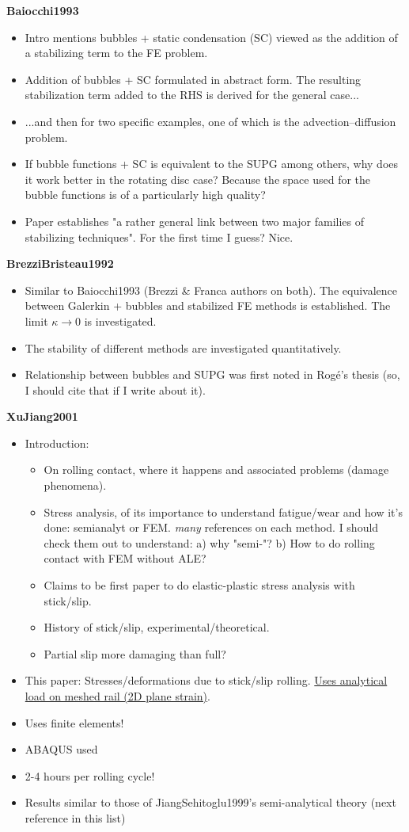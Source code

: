 \documentclass{article}
\begin{document}
\textbf{Baiocchi1993}
\begin{itemize}
\item Intro mentions bubbles + static condensation (SC) viewed as the addition of a stabilizing term to the FE problem.
\item Addition of bubbles + SC formulated in abstract form. The resulting stabilization term added to the RHS is derived for the general case...
\item ...and then for two specific examples, one of which is the advection--diffusion problem.
\item If bubble functions + SC is equivalent to the SUPG among others, why does it work better in the rotating disc case? Because the space used for the bubble functions is of a particularly high quality?
\item Paper establishes "a rather general link between two major families of stabilizing techniques". For the first time I guess? Nice.
\end{itemize}

\textbf{BrezziBristeau1992}
\begin{itemize}
\item Similar to Baiocchi1993 (Brezzi \& Franca authors on both). The equivalence between Galerkin + bubbles and stabilized FE methods is established. The limit $\kappa \rightarrow 0$ is investigated.
\item The stability of different methods are investigated quantitatively.
\item Relationship between bubbles and SUPG was first noted in Rogé's thesis (so, I should cite that if I write about it).
\end{itemize}

\textbf{XuJiang2001}
\begin{itemize}
\item Introduction:
\begin{itemize}
\item On rolling contact, where it happens and associated problems (damage phenomena).
\item Stress analysis, of its importance to understand fatigue/wear and how it's done: semianalyt or FEM. \emph{many} references on each method. I should check them out to understand: a) why "semi-"? b) How to do rolling contact with FEM without ALE?
\item Claims to be first paper to do elastic-plastic stress analysis with stick/slip.
\item History of stick/slip, experimental/theoretical.
\item Partial slip more damaging than full?
\end{itemize}
\item This paper: Stresses/deformations due to stick/slip rolling. \underline{Uses analytical load on meshed rail (2D plane strain)}.
\item Uses finite elements!
\item ABAQUS used
\item 2-4 hours per rolling cycle!
\item Results similar to those of JiangSehitoglu1999's semi-analytical theory (next reference in this list)
\end{itemize}
\end{document}
